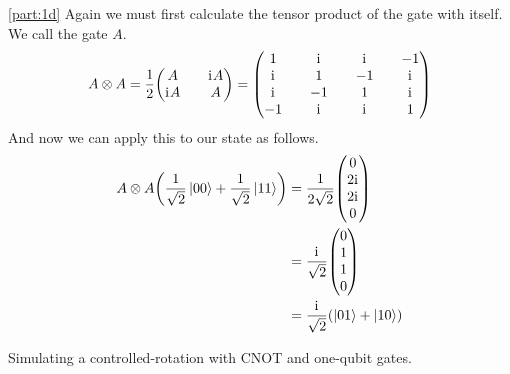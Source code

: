 \documentclass[boxes]{homework}
\newcommand{\iu}{\mathrm{i}\mkern1mu}
\begin{document}
\begin{solution}
	\ref{part:1d}
	Again we must first calculate the tensor product of the gate with itself. We call the gate $A$.
	\begin{equation*}
		A\otimes A = \frac{1}{2}\mqty(A && \iu A \\ \iu A && A) = \mqty(1 && \iu && \iu && -1 \\ \iu && 1 && -1 && \iu \\ \iu && -1 && 1 && \iu \\ -1 && \iu && \iu && 1)
	\end{equation*}
	And now we can apply this to our state as follows.
	\begin{align*}
		A\otimes A \qty(\frac{1}{\sqrt{2}}\ket{00} + \frac{1}{\sqrt{2}}\ket{11}) & = \frac{1}{2\sqrt{2}}\mqty(0                    \\ 2\iu \\ 2\iu \\ 0) \\
		                                                                         & = \frac{\iu}{\sqrt{2}}\mqty(0                   \\ 1 \\ 1 \\ 0) \\
		                                                                         & = \frac{\iu}{\sqrt{2}}\qty(\ket{01} + \ket{10})
	\end{align*}
\end{solution}

\begin{problem}
Simulating a controlled-rotation with CNOT and one-qubit gates.
\end{problem}
\end{document}
